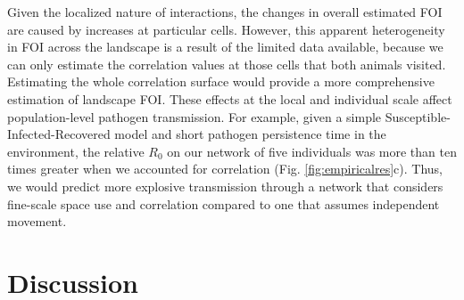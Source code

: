 \documentclass[letterpaper]{article}
\begin{document}
Given the localized nature of interactions, the changes in overall estimated FOI are caused by increases at particular cells. However, this apparent heterogeneity in FOI across the landscape is a result of the limited data available, because we can only estimate the correlation values at those cells that both animals visited. Estimating the whole correlation surface would provide a more comprehensive estimation of landscape FOI. %
These effects at the local and individual scale affect population-level pathogen transmission. For example, given a simple Susceptible-Infected-Recovered model and short pathogen persistence time in the environment, the relative $R_0$ on our network of five individuals was more than ten times greater when we accounted for correlation (Fig. \ref{fig:empiricalres}c). Thus, we would predict more explosive transmission through a network that considers fine-scale space use and correlation compared to one that assumes independent movement.

\section*{Discussion}
\end{document}

